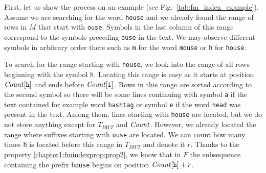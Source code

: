 First, let us show the process on an example (see Fig.~\ref{tab:fm_index_example}). Assume we are
searching for the word {\tt house} and we already found the range of rows in $M$ that start with
{\tt ouse}. Symbols in the last column of this range correspond to the symbols preceding {\tt ouse}
in the text. We may observe different symbols in arbitrary order there such as {\tt m} for the word
{\tt mouse} or {\tt h} for {\tt house}.

To search for the range starting with {\tt house}, we look into the range of all rows beginning with the
symbol {\tt h}. Locating this range is easy as it starts at position $\mathit{Count}[\texttt{h}]$ and ends before
$\mathit{Count}[\texttt{i}]$. Rows in this range are sorted according to the second symbol so there will be some
lines continuing with symbol {\tt a} if the text contained for example word {\tt hashtag} or symbol {\tt e}
if the word {\tt head} was present in the text. Among them, lines starting with {\tt house} are located,
but we do not store anything except for $T_{BWT}$ and $\mathit{Count}$. However, we already located the range
where suffixes starting with {\tt ouse} are located. We can count how many times {\tt h} is located before
this range in $T_{BWT}$ and denote it $r$. Thanks to the property \ref{chapter1:fmindexprop:prop2}, we know
that in $F$ the subsequence containing the prefix {\tt house} begins on position $\mathit{Count}[\texttt{h}]+r$.

